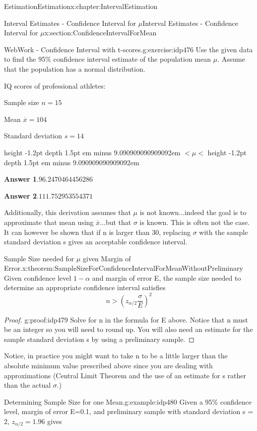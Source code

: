 \documentclass[oneside,10pt,]{book}
\newcommand{\blocktitlefont}{\relax}
\newcommand{\fillin}[1]{\leavevmode\leaders\vrule height -1.2pt depth 1.5pt \hskip #1em minus #1em \null}
\numberwithin{equation}{section}
\newcommand{\lt}{<}
\newcommand{\gt}{>}
\begin{document}
\begin{chapterptx}{Estimation}{}{Estimation}{}{}{x:chapter:IntervalEstimation}
\begin{sectionptx}{Interval Estimates - Confidence Interval for \(\mu\)}{}{Interval Estimates - Confidence Interval for \(\mu\)}{}{}{x:section:ConfidenceIntervalForMean}
\begin{inlineexercise}{WebWork - Confidence Interval with t-scores.}{g:exercise:idp476}
Use the given data to find the 95\% confidence interval estimate of the population mean \(\mu\). Assume that the population has a normal distribution.%
\par
IQ scores of professional athletes:%
\par
Sample size \(n = 15\)%
\par
Mean \(\overline{x} = 104\)%
\par
Standard deviation \(s  = 14\)%
\par
\fillin{9.090909090909092} \(\lt  \mu \lt \) \fillin{9.090909090909092}%
\par\smallskip%
\noindent\textbf{\blocktitlefont Answer 1}.\hypertarget{g:answer:idp477}{}\quad{}\(96.2470464456286\)%
\par\smallskip%
\noindent\textbf{\blocktitlefont Answer 2}.\hypertarget{g:answer:idp478}{}\quad{}\(111.752953554371\)%
\end{inlineexercise}%
Additionally, this derivation assumes that \(\mu\) is not known...indeed the goal is to approximate that mean using \(\overline{x}\)...but that \(\sigma\) is known. This is often not the case. It can however be shown that if n is larger than 30, replacing \(\sigma\) with the sample standard deviation s gives an acceptable confidence interval.%
\begin{theorem}{Sample Size needed for \(\mu\) given Margin of Error.}{}{x:theorem:SampleSizeForConfidenceIntervalForMeanWithoutPreliminary}%
Given confidence level \(1-\alpha\) and margin of error E, the sample size needed to determine an appropriate confidence interval satisfies%
\begin{equation*}
n \gt \left ( z_{\alpha /2} \frac{\sigma}{E} \right )^2
\end{equation*}
%
\end{theorem}
\begin{proof}{}{g:proof:idp479}
Solve for n in the formula for E above. Notice that n must be an integer so you will need to round up. You will also need an estimate for the sample standard deviation s by using a preliminary sample.%
\end{proof}
Notice, in practice you might want to take n to be a little larger than the absolute minimum value prescribed above since you are dealing with approximations (Central Limit Theorem and the use of an estimate for s rather than the actual \(\sigma\).)%
\begin{example}{Determining Sample Size for one Mean.}{g:example:idp480}%
Given a 95\% confidence level, margin of error E=0.1, and preliminary sample with standard deviation s = 2, \(z_{\alpha / 2} = 1.96\) gives%

\end{example}
\end{sectionptx}
\end{chapterptx}
\end{document}
